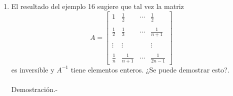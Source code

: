 \begin{enumerate}[\bfseries 1.]
    \item El resultado del ejemplo 16 sugiere que tal vez la matriz
    $$
    A=
    \left[
	\begin{array}{rrrr}
	    1 & \frac{1}{2} & \cdots & \frac{1}{2}\\\\
	    \frac{1}{2} & \frac{1}{3} & \cdots & \frac{1}{n+1}\\\\
	    \vdots & \vdots && \vdots\\\\
	    \frac{1}{n} & \frac{1}{n+1} & \cdots & \frac{1}{2n-1}
	\end{array}
    \right]
    $$
    es inversible y $A^{-1}$ tiene elementos enteros. ¿Se puede demostrar esto?.\\\\
	Demostración.-\;


\end{enumerate}

